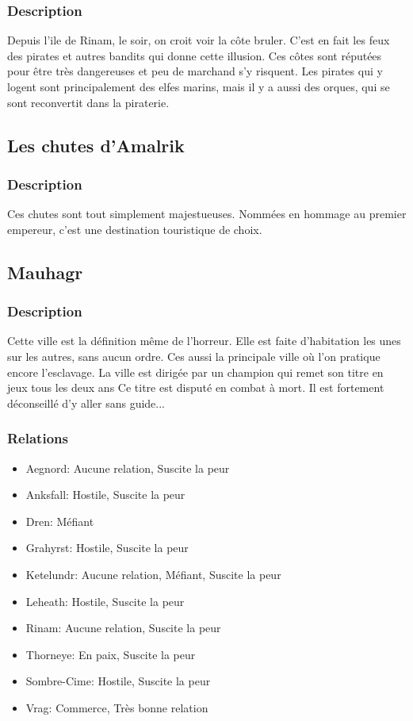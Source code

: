 \subsubsection{Description}
\hypertarget{lescotesardentes}{}Depuis l'ile de Rinam, le soir, on croit voir la côte bruler.
C'est en fait les feux des pirates et autres bandits qui donne cette illusion.
Ces côtes sont réputées pour être très dangereuses et peu de marchand s'y risquent. 
Les pirates qui y logent sont principalement des elfes marins, mais il y a aussi des orques, qui se sont reconvertit dans la piraterie.
\subsection{Les chutes d'Amalrik}
\subsubsection{Description}
\hypertarget {leschutesdamalrik}{}Ces chutes sont tout simplement majestueuses.
Nommées en hommage au premier empereur, c'est une destination touristique de choix.
\subsection{Mauhagr}
\subsubsection{Description}
\hypertarget {mauhagr}{}Cette ville est la définition même de l'horreur.
Elle est faite d'habitation les unes sur les autres, sans aucun ordre. 
Ces aussi la principale ville où l'on pratique encore l'esclavage.
La ville est dirigée par un champion qui remet son titre en jeux tous les deux ans
Ce titre est disputé en combat à mort. 
Il est fortement déconseillé d'y aller sans guide...
\subsubsection{Relations}
\begin{itemize}
\item Aegnord: Aucune relation, Suscite la peur  
\item Anksfall: Hostile, Suscite la peur  
\item Dren: Méfiant   
\item Grahyrst: Hostile, Suscite la peur  
\item Ketelundr: Aucune relation, Méfiant, Suscite la peur 
\item Leheath: Hostile, Suscite la peur  
\item Rinam: Aucune relation, Suscite la peur
\item Thorneye: En paix, Suscite la peur
\item Sombre-Cime: Hostile, Suscite la peur  
\item Vrag: Commerce, Très bonne relation 
\end{itemize}
